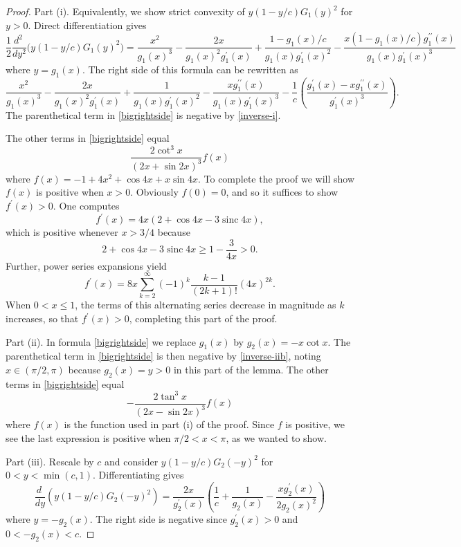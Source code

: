 \documentclass[12pt,reqno]{amsart}
\theoremstyle{definition}
\newcommand{\go}{G_1}
\newcommand{\gt}{G_2}
\newcommand{\sinc}{\operatorname{sinc}}
\begin{document}
\begin{proof}
Part (i). Equivalently, we show strict convexity of $y(1-y/c)\go(y)^2$ for $y>0$. Direct differentiation gives
\[
\frac{1}{2} \frac{d^2\ }{dy^2} \big( y(1-y/c)\go(y)^2 \big) 
=  \frac{x^2}{g_1(x)^3} - \frac{2 x}{g_1(x)^2 g_1^\prime(x)} + \frac{1 - g_1(x)/c}{g_1(x) g_1^\prime(x)^2} - \frac{x (1- g_1(x)/c) g_1^{\prime \prime}(x)}{g_1(x) g_1^\prime(x)^3}
\]
where $y=g_1(x)$. The right side of this formula can be rewritten as
%
\begin{equation} \label{bigrightside}
\frac{x^2}{g_1(x)^3} - \frac{2 x}{g_1(x)^2 g_1^\prime(x)} + \frac{1}{g_1(x) g_1^\prime(x)^2} - \frac{x g_1^{\prime \prime}(x)}{g_1(x) g_1^\prime(x)^3} - \frac{1}{c} \left( \frac{g_1^\prime(x) - x g_1^{\prime \prime}(x)}{g_1^\prime(x)^3} \right) . 
\end{equation}
%
The parenthetical term in \eqref{bigrightside} is negative by \eqref{inverse-i}.

The other terms in \eqref{bigrightside} equal 
\[
\frac{2\cot^3 x}{(2x + \sin 2x)^3} f(x)
\]
where $f(x) = -1 + 4x^2 + \cos 4x + x \sin 4x$. To complete the proof we will show $f(x)$ is positive when $x>0$. Obviously $f(0)=0$, and so it suffices to show $f^\prime(x)>0$. One computes
\[
f^\prime(x) = 4x ( 2 + \cos 4x - 3 \sinc 4x) ,
\]
which is positive whenever $x>3/4$ because 
\[
2 + \cos 4x - 3 \sinc 4x \geq 1 - \frac{3}{4x} > 0.
\]
Further, power series expansions yield
\[
f^\prime(x) = 8x \sum_{k=2}^\infty (-1)^k \frac{k-1}{(2k+1)!} (4x)^{2k} .
\]
When $0 < x \leq 1$, the terms of this alternating series decrease in magnitude as $k$ increases, so that $f^\prime(x)>0$, completing this part of the proof. 

Part (ii). In formula \eqref{bigrightside} we replace $g_1(x)$ by $g_2(x)=-x \cot x$. The parenthetical term in \eqref{bigrightside} is then negative by \eqref{inverse-iib}, noting 
$x \in (\pi/2,\pi)$ because $g_2(x)=y>0$ in this part of the lemma. The other terms in \eqref{bigrightside} equal
\[
-\frac{2\tan^3 x}{(2x - \sin 2 x)^3} f(x)
\]
where $f(x)$ is the function used in part (i) of the proof. Since $f$ is positive, we see the last expression is positive when $\pi/2<x<\pi$, as we wanted to show.

Part (iii). Rescale by $c$ and consider $y(1-y/c)\gt(-y)^2$ for $0<y<\min(c,1)$. Differentiating gives
\[
\frac{d\ }{dy} \left( y(1-y/c)\gt(-y)^2 \right) = \frac{2x}{g_2^\prime(x)} \left( \frac{1}{c}  + \frac{1}{g_2(x)} - \frac{x g_2^\prime(x)}{2g_2(x)^2} \right) 
\]
where $y=-g_2(x)$. The right side is negative since $g_2^\prime(x)>0$ and $0<-g_2(x)<c$. 
\end{proof}
\end{document}
